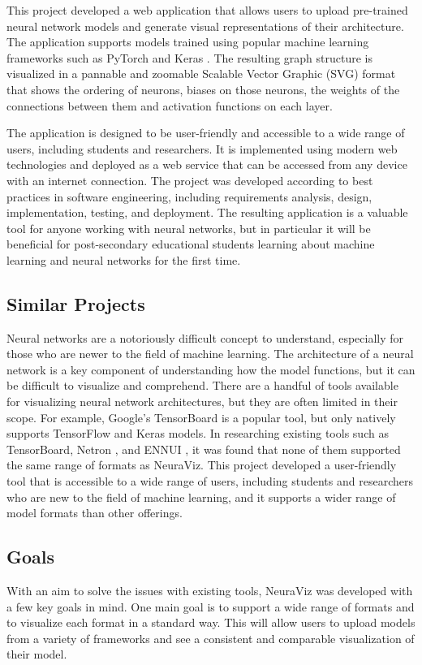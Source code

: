 This project developed a web application that allows users to upload pre-trained neural network models and generate visual representations of their architecture. The application supports models trained using popular machine learning frameworks such as PyTorch \cite{pytorch} and Keras \cite{keras}. The resulting graph structure is visualized in a pannable and zoomable Scalable Vector Graphic (SVG) format that shows the ordering of neurons, biases on those neurons, the weights of the connections between them and activation functions on each layer.

The application is designed to be user-friendly and accessible to a wide range of users, including students and researchers. It is implemented using modern web technologies and deployed as a web service that can be accessed from any device with an internet connection. The project was developed according to best practices in software engineering, including requirements analysis, design, implementation, testing, and deployment. The resulting application is a valuable tool for anyone working with neural networks, but in particular it will be beneficial for post-secondary educational students learning about machine learning and neural networks for the first time.

\subsection{Similar Projects}
Neural networks are a notoriously difficult concept to understand, especially for those who are newer to the field of machine learning. The architecture of a neural network is a key component of understanding how the model functions, but it can be difficult to visualize and comprehend. There are a handful of tools available for visualizing neural network architectures, but they are often limited in their scope. For example, Google's TensorBoard \cite{tensorboard} is a popular tool, but only natively supports TensorFlow and Keras models. In researching existing tools such as TensorBoard, Netron \cite{netron}, and ENNUI \cite{ennui}, it was found that none of them supported the same range of formats as NeuraViz. This project developed a user-friendly tool that is accessible to a wide range of users, including students and researchers who are new to the field of machine learning, and it supports a wider range of model formats than other offerings.

\subsection{Goals}
With an aim to solve the issues with existing tools, NeuraViz was developed with a few key goals in mind. One main goal is to support a wide range of formats and to visualize each format in a standard way. This will allow users to upload models from a variety of frameworks and see a consistent and comparable visualization of their model.

